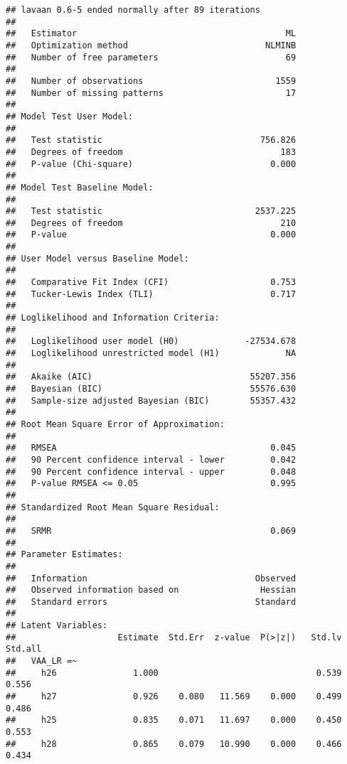 \documentclass[
]{article}
\begin{document}
\begin{verbatim}
## lavaan 0.6-5 ended normally after 89 iterations
## 
##   Estimator                                         ML
##   Optimization method                           NLMINB
##   Number of free parameters                         69
##                                                       
##   Number of observations                          1559
##   Number of missing patterns                        17
##                                                       
## Model Test User Model:
##                                                       
##   Test statistic                               756.826
##   Degrees of freedom                               183
##   P-value (Chi-square)                           0.000
## 
## Model Test Baseline Model:
## 
##   Test statistic                              2537.225
##   Degrees of freedom                               210
##   P-value                                        0.000
## 
## User Model versus Baseline Model:
## 
##   Comparative Fit Index (CFI)                    0.753
##   Tucker-Lewis Index (TLI)                       0.717
## 
## Loglikelihood and Information Criteria:
## 
##   Loglikelihood user model (H0)             -27534.678
##   Loglikelihood unrestricted model (H1)             NA
##                                                       
##   Akaike (AIC)                               55207.356
##   Bayesian (BIC)                             55576.630
##   Sample-size adjusted Bayesian (BIC)        55357.432
## 
## Root Mean Square Error of Approximation:
## 
##   RMSEA                                          0.045
##   90 Percent confidence interval - lower         0.042
##   90 Percent confidence interval - upper         0.048
##   P-value RMSEA <= 0.05                          0.995
## 
## Standardized Root Mean Square Residual:
## 
##   SRMR                                           0.069
## 
## Parameter Estimates:
## 
##   Information                                 Observed
##   Observed information based on                Hessian
##   Standard errors                             Standard
## 
## Latent Variables:
##                    Estimate  Std.Err  z-value  P(>|z|)   Std.lv  Std.all
##   VAA_LR =~                                                             
##     h26               1.000                               0.539    0.556
##     h27               0.926    0.080   11.569    0.000    0.499    0.486
##     h25               0.835    0.071   11.697    0.000    0.450    0.553
##     h28               0.865    0.079   10.990    0.000    0.466    0.434

\end{verbatim}
\end{document}
